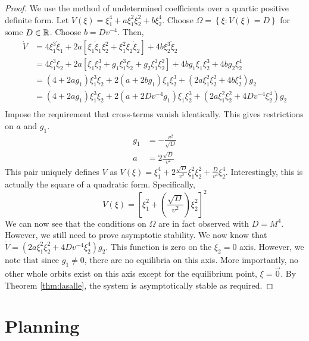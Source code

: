 \documentclass[oneside, 11pt]{book}
\begin{document}
\begin{proof}
    We use the method of undetermined coefficients over a quartic positive definite form. Let $V(\xi) = \xi_1^4 + a\xi_1^2\xi_2^2 + b\xi_2^4$. Choose $\Omega=\left\{\xi : V(\xi) = D\right\}$ for some $D\in\mathbb{R}$. Choose $b=Dv^{-4}$. Then,
    \begin{align*}
        \dot{V} &=  4\xi_1^3\dot{\xi}_1 + 2a\left[\xi_1\dot{\xi}_1\xi_2^2 + \xi_1^2\xi_2\dot{\xi}_2\right] + 4b\xi_2^3\dot{\xi}_2\\
                &=  4\xi_1^3\xi_2 + 2a\left[\xi_1\xi_2^3 + g_1\xi_1^3\xi_2 + g_2\xi_1^2\xi_2^2\right] + 4bg_1\xi_1\xi_2^3 + 4bg_2\xi_2^4\\
                &=  \left(4+2ag_1\right)\xi_1^3\xi_2 + 2\left(a + 2bg_1\right)\xi_1\xi_2^3 + \left(2a\xi_1^2\xi_2^2 + 4b\xi_2^4\right)g_2\\
                &=  \left(4+2ag_1\right)\xi_1^3\xi_2 + 2\left(a + 2Dv^{-4}g_1\right)\xi_1\xi_2^3 + \left(2a\xi_1^2\xi_2^2 + 4Dv^{-4}\xi_2^4\right)g_2\\
    \end{align*}
    Impose the requirement that cross-terms vanish identically. This gives restrictions on $a$ and $g_1$.
    \begin{align*}
        g_1 &= -\frac{v^2}{\sqrt{D}}\\
        a &= 2\frac{\sqrt{D}}{v^2}
    \end{align*}
    This pair uniquely defines $V$ as $V(\xi) = \xi_1^4 + 2\frac{\sqrt{D}}{v^2}\xi_1^2\xi_2^2 + \frac{D}{v^4}\xi_2^4$. Interestingly, this is actually the square of a quadratic form. Specifically,
    $$
        V(\xi) = \left[\xi_1^2 + \left(\frac{\sqrt{D}}{v^2}\right)\xi_2^2 \right]^2
    $$
    We can now see that the conditions on $\Omega$ are in fact observed with $D = M^4$. However, we still need to prove asymptotic stability. We now know that $\dot{V} = \left(2a\xi_1^2\xi_2^2 + 4Dv^{-4}\xi_2^4\right)g_2$. This function is zero on the $\xi_2=0$ axis. However, we note that since $g_1 \neq 0$, there are no equilibria on this axis. More importantly, no other whole orbits exist on this axis except for the equilibrium point, $\xi=\vec{0}$. By Theorem \ref{thm:lasalle}, the system is asymptotically stable as required.
\end{proof}

\chapter{Planning}\label{sec:planning}
\end{document}
